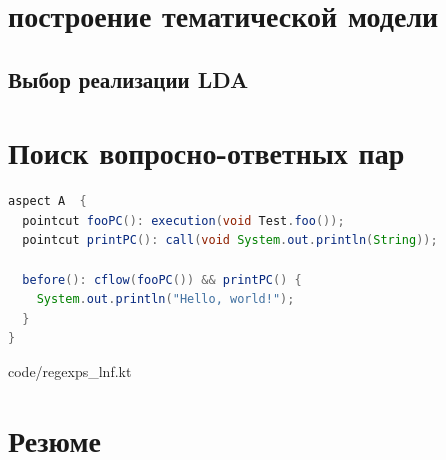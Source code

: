 \section{построение тематической модели}
\subsection{Выбор реализации LDA}
\label{sec:lda_choose}
\section{Поиск вопросно-ответных пар}


  \begin{lstlisting}[language=Java, label={lst:aspectj_example}, 
  caption={Пример описания аспектов в AspectJ}]
aspect A  {
  pointcut fooPC(): execution(void Test.foo());
  pointcut printPC(): call(void System.out.println(String));
  
  before(): cflow(fooPC()) && printPC() {
    System.out.println("Hello, world!");
  }
}
  \end{lstlisting}


{code/regexps_lnf.kt}

\section{Резюме}

